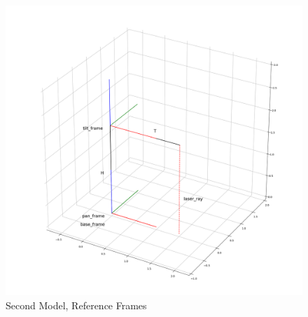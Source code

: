 \begin{figure}
	\centering
	\includegraphics[width=\textwidth]{img/secondModel.png}%
	\caption{Second Model, Reference Frames}
	\label{fig:secondModelRefFrame}
\end{figure}

